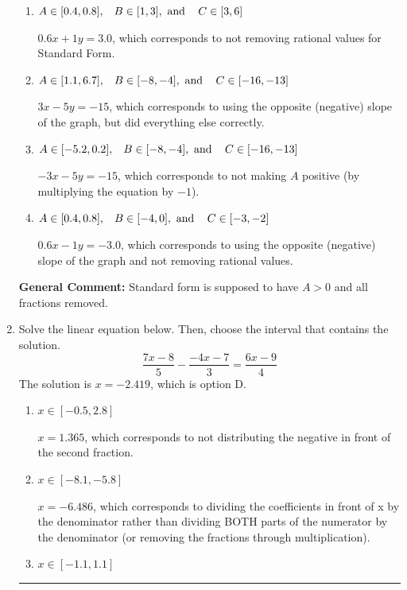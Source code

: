 \documentclass{extbook}[14pt]
\newcommand{\litem}[1]{\item #1

\rule{\textwidth}{0.4pt}}
\begin{document}
\begin{enumerate}
{\begin{enumerate}[label=\Alph*.]
* $3x + 5y = 15$, which is the correct option.
\item \( A \in [0.4, 0.8], \hspace{3mm} B \in [1, 3], \text{ and } \hspace{3mm} C \in [3, 6] \)

 $0.6x + 1y = 3.0$, which corresponds to not removing rational values for Standard Form.
\item \( A \in [1.1, 6.7], \hspace{3mm} B \in [-8, -4], \text{ and } \hspace{3mm} C \in [-16, -13] \)

 $3x - 5y = -15$, which corresponds to using the opposite (negative) slope of the graph, but did everything else correctly.
\item \( A \in [-5.2, 0.2], \hspace{3mm} B \in [-8, -4], \text{ and } \hspace{3mm} C \in [-16, -13] \)

 $-3x - 5y = -15$, which corresponds to not making $A$ positive (by multiplying the equation by $-1$).
\item \( A \in [0.4, 0.8], \hspace{3mm} B \in [-4, 0], \text{ and } \hspace{3mm} C \in [-3, -2] \)

 $0.6x - 1y = -3.0$, which corresponds to using the opposite (negative) slope of the graph and not removing rational values.
\end{enumerate}

\textbf{General Comment:} Standard form is supposed to have $A > 0$ and all fractions removed.
}
\litem{
Solve the linear equation below. Then, choose the interval that contains the solution.
\[ \frac{7x -8}{5} - \frac{-4x -7}{3} = \frac{6x -9}{4} \]The solution is \( x = -2.419 \), which is option D.\begin{enumerate}[label=\Alph*.]
\item \( x \in [-0.5, 2.8] \)

 $x = 1.365$, which corresponds to not distributing the negative in front of the second fraction.
\item \( x \in [-8.1, -5.8] \)

 $x = -6.486$, which corresponds to dividing the coefficients in front of x by the denominator rather than dividing BOTH parts of the numerator by the denominator (or removing the fractions through multiplication).
\item \( x \in [-1.1, 1.1] \)


\end{enumerate}}
\end{enumerate}
\end{document}
